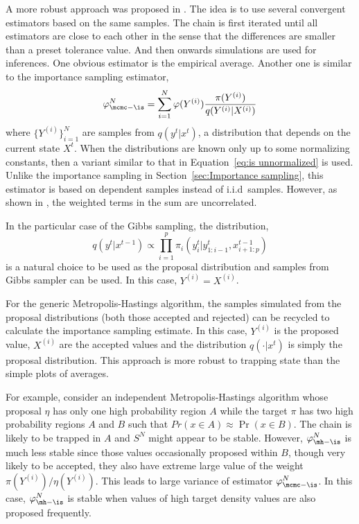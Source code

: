 

A more robust approach was proposed in \cite{Robert:1995ge}. The idea is to use several convergent estimators based on the same samples. The chain is first iterated until all estimators are close to each other in the sense that the differences are smaller than a preset tolerance value. And then onwards simulations are used for inferences. One obvious estimator is the empirical average. Another one is similar to the importance sampling estimator,
\begin{equation}
  \varphi_{\mcmc-\is}^N
  = \sum_{i=1}^N \varphi(Y^{(i)})\frac{\pi(Y^{(i)})}{q(Y^{(i)}|X^{(i)})}
  \label{eq:sn is}
\end{equation}
where $\{Y^{(i)}\}_{i=1}^N$ are samples from $q(y^t|x^t)$, a distribution that depends on the current state $X^t$. When the distributions are known only up to some normalizing constants, then a variant similar to that in Equation~\eqref{eq:is unnormalized} is used. Unlike the importance sampling in Section~\ref{sec:Importance sampling}, this estimator is based on dependent samples instead of i.i.d\ samples. However, as shown in \cite[][Lemma~12.11]{Robert:2004tn}, the weighted terms in the sum are uncorrelated.

In the particular case of the Gibbs sampling, the distribution,
\begin{equation}
  q(y^t|x^{t-1}) \propto
  \prod_{i=1}^p \pi_i(y_i^t|y_{1:i-1}^t,x_{i+1:p}^{t-1})
\end{equation}
is a natural choice to be used as the proposal distribution and samples from Gibbs sampler can be used. In this case, $Y^{(i)} = X^{(i)}$.

For the generic Metropolis-Hastings algorithm, the samples simulated from the proposal distributions (both those accepted and rejected) can be recycled to calculate the importance sampling estimate. In this case, $Y^{(i)}$ is the proposed value, $X^{(i)}$ are the accepted values and the distribution $q(\cdot|x^t)$ is simply the proposal distribution. This approach is more robust to trapping state than the simple plots of averages.

For example, consider an independent Metropolis-Hastings algorithm whose proposal $\eta$ has only one high probability region $A$ while the target $\pi$ has two high probability regions $A$ and $B$ such that $Pr(x\in A)\approx\Pr(x\in B)$. The chain is likely to be trapped in $A$ and $S^N$ might appear to be stable. However, $\varphi_{\mh-\is}^N$ is much less stable since those values occasionally proposed within $B$, though very likely to be accepted, they also have extreme large value of the weight $\pi(Y^{(i)})/\eta(Y^{(i)})$. This leads to large variance of estimator $\varphi_{\mcmc-\is}^N$. In this case, $\varphi_{\mh-\is}^N$ is stable when values of high target density values are also proposed frequently.

